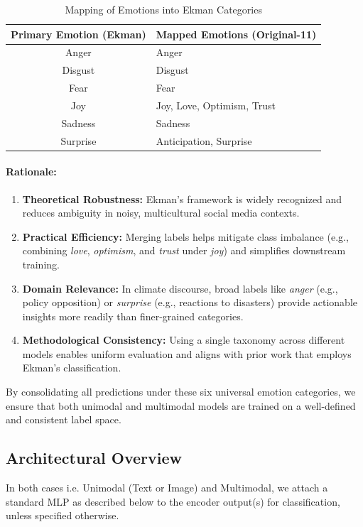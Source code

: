 \begin{table}[ht]
    \centering
    \begin{tabular}{|c|l|}
        \hline
        \textbf{Primary Emotion (Ekman)} & \textbf{Mapped Emotions (Original-11)} \\
        \hline
        Anger     & Anger \\
        Disgust   & Disgust \\
        Fear      & Fear \\
        Joy       & Joy, Love, Optimism, Trust \\
        Sadness   & Sadness \\
        Surprise  & Anticipation, Surprise \\
        \hline
    \end{tabular}
    \caption{Mapping of Emotions into Ekman Categories}
    \label{tab:emotion_mapping}
\end{table}

\paragraph{Rationale:}
\begin{enumerate}
    \item \textbf{Theoretical Robustness:} Ekman’s framework is widely recognized and reduces ambiguity in noisy, multicultural social media contexts.
    \item \textbf{Practical Efficiency:} Merging labels helps mitigate class imbalance (e.g., combining \emph{love}, \emph{optimism}, and \emph{trust} under \emph{joy}) and simplifies downstream training.
    \item \textbf{Domain Relevance:} In climate discourse, broad labels like \emph{anger} (e.g., policy opposition) or \emph{surprise} (e.g., reactions to disasters) provide actionable insights more readily than finer-grained categories.
    \item \textbf{Methodological Consistency:} Using a single taxonomy across different models enables uniform evaluation and aligns with prior work that employs Ekman’s classification.
\end{enumerate}

By consolidating all predictions under these six universal emotion categories, we ensure that both unimodal and multimodal models are trained on a well-defined and consistent label space.


\subsection{Architectural Overview}
In both cases i.e. Unimodal (Text or Image) and Multimodal, we attach a standard MLP as described below to the encoder output(s) for classification, unless specified otherwise. 

